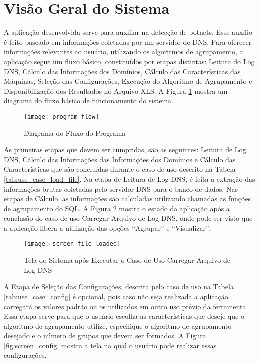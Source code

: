 \section{Visão Geral do Sistema}
A aplicação desenvolvida serve para auxiliar na detecção de botnets. Esse auxílio é feito baseado em informações coletadas por um servidor de DNS. Para oferecer informações relevantes ao usuário, utilizando os algoritmos de agrupamento, a aplicação segue um fluxo básico, constituídos por etapas distintas: Leitura do Log DNS, Cálculo das Informações dos Domínios, Cálculo das Características das Máquinas, Seleção das Configurações, Execução do Algoritmo de Agrupamento e Disponibilização dos Resultados no Arquivo XLS. A Figura \ref{fig:program_flow} mostra um diagrama do fluxo básico de funcionamento do sistema.

\begin{figure}
\centering
\texttt{[image: program\_flow]}
\caption[Diagram do Fluxo do Programa]{Diagrama do Fluxo do Programa} \label{fig:program_flow}
\end{figure}

As primeiras etapas que devem ser cumpridas, são as seguintes: Leitura de Log DNS, Cálculo das Informações das Informações dos Domínios e Cálculo das Características que são concluídas durante o caso de uso descrito na Tabela \ref{tab:use_case_load_file}. Na etapa de Leitura de Log DNS, é feita a extração das informações brutas coletadas pelo servidor DNS para o banco de dados. Nas etapas de Cálculo, as informações são calculadas utilizando chamadas as funções de agrupamento do SQL. A Figura \ref{fig:screen_file_loaded} mostra o estado da aplicação após a conclusão do caso de uso Carregar Arquivo de Log DNS, onde pode ser visto que a aplicação libera a utilização das opções ``Agrupar'' e ``Visualizar''.

\begin{figure}
\centering
\texttt{[image: screen\_file\_loaded]}
\caption[Tela do Sistema após Executar o Caso de Uso Carregar Arquivo de Log DNS]{Tela do Sistema após Executar o Caso de Uso Carregar Arquivo de Log DNS} \label{fig:screen_file_loaded}
\end{figure}

A Etapa de Seleção das Configurações, descrita pelo caso de uso na Tabela \ref{tab:use_case_config} é opcional, pois caso não seja realizada a aplicação carregará os valores padrão ou os utilizados em outro uso prévio da ferramenta. Essa etapa serve para que o usuário escolha as características que deseje que o algoritmo de agrupamento utilize, especifique o algoritmo de agrupamento desejado e o número de grupos que devem ser formados. A Figura \ref{fig:screen_config} mostra a tela na qual o usuário pode realizar essas configurações.

